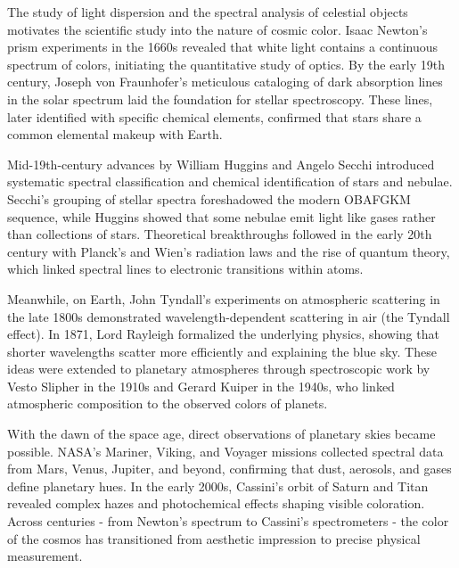\begin{historical}
The study of light dispersion and the spectral analysis of celestial objects motivates the scientific study into the nature of cosmic color. Isaac Newton's prism experiments in the 1660s revealed that white light contains a continuous spectrum of colors, initiating the quantitative study of optics. By the early 19th century, Joseph von Fraunhofer's meticulous cataloging of dark absorption lines in the solar spectrum laid the foundation for stellar spectroscopy. These lines, later identified with specific chemical elements, confirmed that stars share a common elemental makeup with Earth.

Mid-19th-century advances by William Huggins and Angelo Secchi introduced systematic spectral classification and chemical identification of stars and nebulae. Secchi's grouping of stellar spectra foreshadowed the modern OBAFGKM sequence, while Huggins showed that some nebulae emit light like gases rather than collections of stars. Theoretical breakthroughs followed in the early 20th century with Planck's and Wien's radiation laws and the rise of quantum theory, which linked spectral lines to electronic transitions within atoms.

Meanwhile, on Earth, John Tyndall's experiments on atmospheric scattering in the late 1800s demonstrated wavelength-dependent scattering in air (the Tyndall effect). In 1871, Lord Rayleigh formalized the underlying physics, showing that shorter wavelengths scatter more efficiently and explaining the blue sky. These ideas were extended to planetary atmospheres through spectroscopic work by Vesto Slipher in the 1910s and Gerard Kuiper in the 1940s, who linked atmospheric composition to the observed colors of planets.

With the dawn of the space age, direct observations of planetary skies became possible. NASA's Mariner, Viking, and Voyager missions collected spectral data from Mars, Venus, Jupiter, and beyond, confirming that dust, aerosols, and gases define planetary hues. In the early 2000s, Cassini's orbit of Saturn and Titan revealed complex hazes and photochemical effects shaping visible coloration. Across centuries - from Newton's spectrum to Cassini's spectrometers - the color of the cosmos has transitioned from aesthetic impression to precise physical measurement.
\end{historical}
